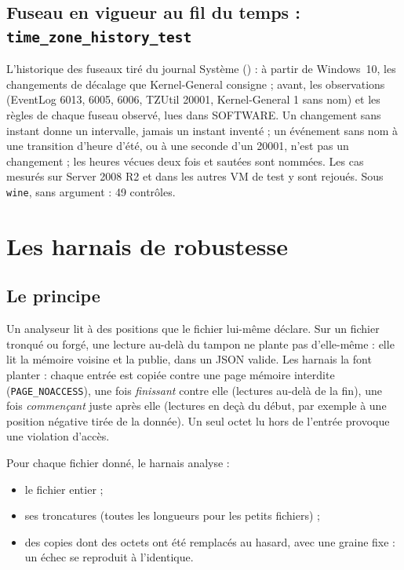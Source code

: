 \documentclass[11pt,a4paper,oneside]{report}
\begin{document}
\section{Fuseau en vigueur au fil du temps : \texttt{time\_zone\_history\_test}}

L'historique des fuseaux tiré du journal Système
() : à partir de Windows~10, les changements
de décalage que Kernel-General consigne ; avant, les observations (EventLog
6013, 6005, 6006, TZUtil 20001, Kernel-General 1 sans nom) et les règles de
chaque fuseau observé, lues dans SOFTWARE. Un changement sans instant donne un
intervalle, jamais un instant inventé ; un événement sans nom à une transition
d'heure d'été, ou à une seconde d'un 20001, n'est pas un changement ; les
heures vécues deux fois et sautées sont nommées. Les cas mesurés sur Server 2008 R2
et dans les autres VM de test y sont rejoués. Sous \texttt{wine}, sans argument : 49
contrôles.

\chapter{Les harnais de robustesse}\label{ch:robustesse}

\section{Le principe}

Un analyseur lit à des positions que le fichier lui-même déclare. Sur un
fichier tronqué ou forgé, une lecture au-delà du tampon ne plante pas
d'elle-même : elle lit la mémoire voisine et la publie, dans un JSON valide.
Les harnais la font planter : chaque entrée est copiée contre une page mémoire
interdite (\texttt{PAGE\_NOACCESS}), une fois \emph{finissant} contre elle
(lectures au-delà de la fin), une fois \emph{commençant} juste après elle
(lectures en deçà du début, par exemple à une position négative tirée de la
donnée). Un seul octet lu hors de l'entrée provoque une violation d'accès.

Pour chaque fichier donné, le harnais analyse :
\begin{itemize}
  \item le fichier entier ;
  \item ses troncatures (toutes les longueurs pour les petits fichiers) ;
  \item des copies dont des octets ont été remplacés au hasard, avec une graine
    fixe : un échec se reproduit à l'identique.
\end{itemize}
\end{document}
